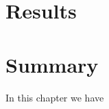 \begin{table}
{\begin{tabularx}{\linewidth}{l|XlX}
        \bottomrule
    \end{tabularx}
    }
    \label{tab:overview-honeypots}
\end{table}

\section{Results}
\label{sec:honeypots-heicloud}


\section{Summary}

In this chapter we have



